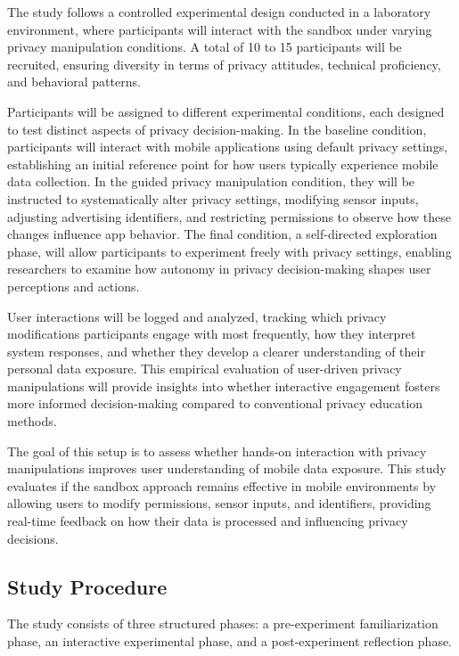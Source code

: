 \documentclass[acmlarge, nonacm]{acmart}
\begin{document}
The study follows a controlled experimental design conducted in a laboratory environment, where participants will interact with the sandbox under varying privacy manipulation conditions. A total of 10 to 15 participants will be recruited, ensuring diversity in terms of privacy attitudes, technical proficiency, and behavioral patterns.

Participants will be assigned to different experimental conditions, each designed to test distinct aspects of privacy decision-making. In the baseline condition, participants will interact with mobile applications using default privacy settings, establishing an initial reference point for how users typically experience mobile data collection. In the guided privacy manipulation condition, they will be instructed to systematically alter privacy settings, modifying sensor inputs, adjusting advertising identifiers, and restricting permissions to observe how these changes influence app behavior. The final condition, a self-directed exploration phase, will allow participants to experiment freely with privacy settings, enabling researchers to examine how autonomy in privacy decision-making shapes user perceptions and actions.

User interactions will be logged and analyzed, tracking which privacy modifications participants engage with most frequently, how they interpret system responses, and whether they develop a clearer understanding of their personal data exposure. This empirical evaluation of user-driven privacy manipulations will provide insights into whether interactive engagement fosters more informed decision-making compared to conventional privacy education methods.

The goal of this setup is to assess whether hands-on interaction with privacy manipulations improves user understanding of mobile data exposure. This study evaluates if the sandbox approach remains effective in mobile environments by allowing users to modify permissions, sensor inputs, and identifiers, providing real-time feedback on how their data is processed and influencing privacy decisions.

\subsection{Study Procedure}

The study consists of three structured phases: a pre-experiment familiarization phase, an interactive experimental phase, and a post-experiment reflection phase.
\end{document}

